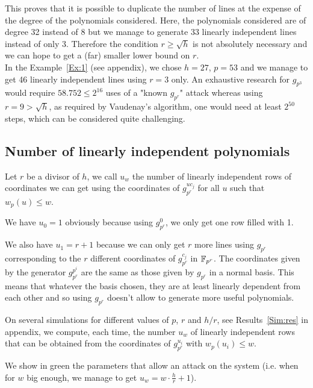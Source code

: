 \documentclass[a4paper]{article}
\begin{document}
This proves that it is possible to duplicate the number of lines at the expense of the degree of the polynomials considered. Here, the polynomials considered are of degree 32 instead of 8 but we manage to generate 33 linearly independent lines instead of only 3. Therefore the condition $r \geq \sqrt{h}$ is not absolutely necessary and we can hope to get a (far) smaller lower bound on $r$.\\

In the Example~\ref{Ex:1} (see appendix), we chose $h = 27$, $p = 53$ and we manage to get 46 linearly independent lines using $r = 3$ only.
An exhaustive research for $g_{p^3}$ would require $58.752 \leq  2^{16}$ uses of a "known $g_{p^r}$" attack whereas using $r = 9 > \sqrt{h}$, as required by Vaudenay's algorithm, one would need at least $2^{50}$ steps, which can be considered quite challenging.\\



\subsection{Number of linearly independent polynomials}

Let $r$ be a divisor of $h$, we call $u_w$ the number of linearly independent rows of coordinates we can get using the coordinates of $g_{p^r}^{uc_j}$ for all $u$ such that $w_p(u) \leq w$.

We have $u_0 = 1$ obviously because using $g_{p^r}^0$, we only get one row filled with 1.

We also have $u_1 = r+1$ because we can only get $r$ more lines using $g_{p^r}$ corresponding to the $r$ different coordinates of $g_{p^r}^{c_j}$ in $\mathbb{F}_{p^r}$. The coordinates given by the generator $g_{p^r}^{p^i}$ are the same as those given by $g_{p^r}$ in a normal basis. This means that whatever the basis chosen, they are at least linearly dependent from each other and so using $g_{p^r}$ doesn't allow to generate more useful polynomials.


On several simulations for different values of $p$, $r$ and $h/r$, see Results~\ref{Sim:res} in appendix, we compute, each time, the number $u_w$ of linearly independent rows that can be obtained from the coordinates of $g_{p^r}^{u_i}$ with $w_p(u_i) \leq w$.

We show in green the parameters that allow an attack on the system (i.e. when for $w$ big enough, we manage to get $u_w = w\cdot \frac{h}{r} +1$).
\end{document}
